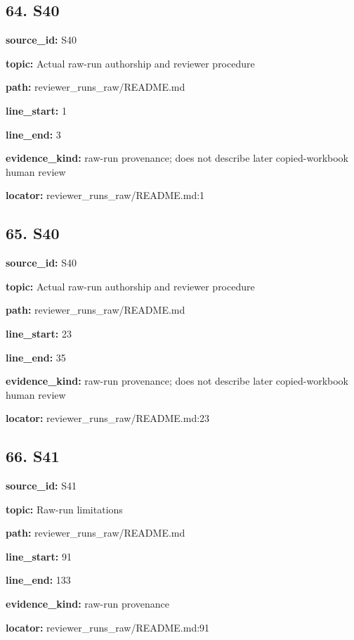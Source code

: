 \documentclass[10pt,a4paper]{article}
\begin{document}
\subsection*{64.\allowbreak{} S40}
\textbf{source\_\allowbreak{}id:} S40\par
\textbf{topic:} Actual raw-\allowbreak{}run authorship and reviewer procedure\par
\textbf{path:} reviewer\_\allowbreak{}runs\_\allowbreak{}raw/\allowbreak{}README.\allowbreak{}md\par
\textbf{line\_\allowbreak{}start:} 1\par
\textbf{line\_\allowbreak{}end:} 3\par
\textbf{evidence\_\allowbreak{}kind:} raw-\allowbreak{}run provenance; does not describe later copied-\allowbreak{}workbook human review\par
\textbf{locator:} reviewer\_\allowbreak{}runs\_\allowbreak{}raw/\allowbreak{}README.\allowbreak{}md:1\par
\subsection*{65.\allowbreak{} S40}
\textbf{source\_\allowbreak{}id:} S40\par
\textbf{topic:} Actual raw-\allowbreak{}run authorship and reviewer procedure\par
\textbf{path:} reviewer\_\allowbreak{}runs\_\allowbreak{}raw/\allowbreak{}README.\allowbreak{}md\par
\textbf{line\_\allowbreak{}start:} 23\par
\textbf{line\_\allowbreak{}end:} 35\par
\textbf{evidence\_\allowbreak{}kind:} raw-\allowbreak{}run provenance; does not describe later copied-\allowbreak{}workbook human review\par
\textbf{locator:} reviewer\_\allowbreak{}runs\_\allowbreak{}raw/\allowbreak{}README.\allowbreak{}md:23\par
\subsection*{66.\allowbreak{} S41}
\textbf{source\_\allowbreak{}id:} S41\par
\textbf{topic:} Raw-\allowbreak{}run limitations\par
\textbf{path:} reviewer\_\allowbreak{}runs\_\allowbreak{}raw/\allowbreak{}README.\allowbreak{}md\par
\textbf{line\_\allowbreak{}start:} 91\par
\textbf{line\_\allowbreak{}end:} 133\par
\textbf{evidence\_\allowbreak{}kind:} raw-\allowbreak{}run provenance\par
\textbf{locator:} reviewer\_\allowbreak{}runs\_\allowbreak{}raw/\allowbreak{}README.\allowbreak{}md:91\par
\clearpage
\end{document}

